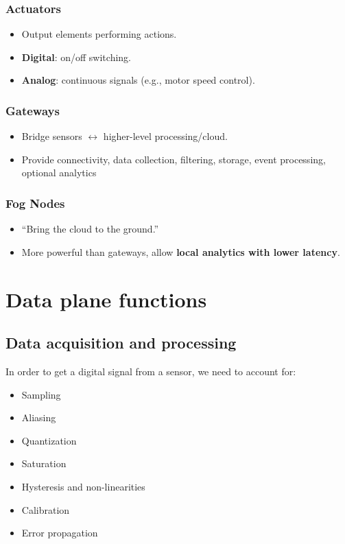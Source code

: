 \subsubsection{Actuators}
\begin{itemize}
    \item Output elements performing actions.
    \item \textbf{Digital}: on/off switching.
    \item \textbf{Analog}: continuous signals (e.g., motor speed control).
\end{itemize}

\subsubsection{Gateways}
\begin{itemize}
    \item Bridge sensors $\leftrightarrow$ higher-level processing/cloud.
    \item Provide connectivity, data collection, filtering, storage, event processing, optional analytics
\end{itemize}

\subsubsection{Fog Nodes}
\begin{itemize}
    \item ``Bring the cloud to the ground.''
    \item More powerful than gateways, allow \textbf{local analytics with lower latency}.
\end{itemize}

\section{Data plane functions}

\subsection{Data acquisition and processing}

In order to get a digital signal from a sensor, we need to account for:
\begin{itemize}
    \item Sampling
    \item Aliasing
    \item Quantization
    \item Saturation
    \item Hysteresis and non-linearities
    \item Calibration
    \item Error propagation
\end{itemize}

